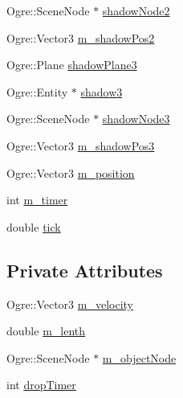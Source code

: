 \begin{DoxyCompactItemize}
Ogre\-::\-Scene\-Node $\ast$ \hyperlink{class_cube_ab0dd9287bdc0dd3d3c86720b8063e1c7}{shadow\-Node2}
\item 
Ogre\-::\-Vector3 \hyperlink{class_cube_a2c7d96e22d8bf8fe5b1da82b4a919b1f}{m\-\_\-shadow\-Pos2}
\item 
Ogre\-::\-Plane \hyperlink{class_cube_a26706404bc0586106f3ce0539b5aefb9}{shadow\-Plane3}
\item 
Ogre\-::\-Entity $\ast$ \hyperlink{class_cube_a26a6af67ab33f0823ab676f918be4693}{shadow3}
\item 
Ogre\-::\-Scene\-Node $\ast$ \hyperlink{class_cube_a46e45c5df1c3b06a722792c0fe7a3a99}{shadow\-Node3}
\item 
Ogre\-::\-Vector3 \hyperlink{class_cube_a3640e2093c74415355ca18c676ce55d3}{m\-\_\-shadow\-Pos3}
\item 
Ogre\-::\-Vector3 \hyperlink{class_cube_aa5ab2527959955b999b24f175c8451cd}{m\-\_\-position}
\item 
int \hyperlink{class_cube_a7500a909cbc9f7f57056ce30d578b2f2}{m\-\_\-timer}
\item 
double \hyperlink{class_cube_a46f7e77fdc6bd86d23c36553356bded6}{tick}
\end{DoxyCompactItemize}
\subsection*{Private Attributes}
\begin{DoxyCompactItemize}
\item 
Ogre\-::\-Vector3 \hyperlink{class_cube_a516fe89321f3e9929f46b1c110abaca9}{m\-\_\-velocity}
\item 
double \hyperlink{class_cube_aa06856d486384e88a787d800fb981d6d}{m\-\_\-lenth}
\item 
Ogre\-::\-Scene\-Node $\ast$ \hyperlink{class_cube_adb69c60fc68857cb95c19aa45be0bc06}{m\-\_\-object\-Node}
\item 
int \hyperlink{class_cube_a0b3149f410be4e58a6ff7f8fd65cfb27}{drop\-Timer}
\end{DoxyCompactItemize}


